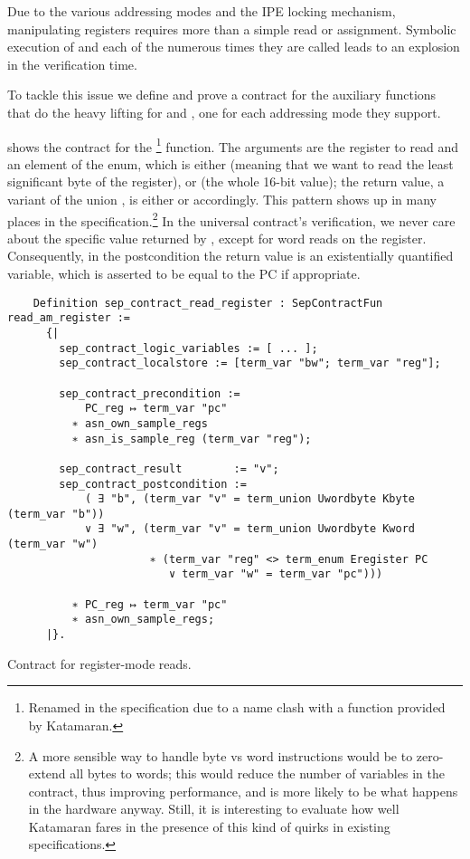 Due to the various addressing modes and the IPE locking mechanism, manipulating registers requires more than a simple read or assignment. Symbolic execution of  and  each of the numerous times they are called leads to an explosion in the verification time.

To tackle this issue we define and prove a contract for the auxiliary functions that do the heavy lifting for  and , one for each addressing mode they support.

 shows the contract for the \footnote{Renamed  in the \usail specification due to a name clash with a function provided by Katamaran.} function. The arguments are the register to read and an element of the  enum, which is either  (meaning that we want to read the least significant byte of the register), or  (the whole 16-bit value); the return value, a variant of the union , is either  or  accordingly. This pattern shows up in many places in the \msp \usail specification.\footnote{A more sensible way to handle byte vs word instructions would be to zero-extend all bytes to words; this would reduce the number of variables in the contract, thus improving performance, and is more likely to be what happens in the hardware anyway. Still, it is interesting to evaluate how well Katamaran fares in the presence of this kind of quirks in existing specifications.} In the universal contract's verification, we never care about the specific value returned by , except for word reads on the  register. Consequently, in the postcondition the return value is an existentially quantified variable, which is asserted to be equal to the PC if appropriate.

\begin{listing}
  \begin{verbatim}
    Definition sep_contract_read_register : SepContractFun read_am_register :=
      {|
        sep_contract_logic_variables := [ ... ];
        sep_contract_localstore := [term_var "bw"; term_var "reg"];

        sep_contract_precondition :=
            PC_reg ↦ term_var "pc"
          ∗ asn_own_sample_regs
          ∗ asn_is_sample_reg (term_var "reg");

        sep_contract_result        := "v";
        sep_contract_postcondition :=
            ( ∃ "b", (term_var "v" = term_union Uwordbyte Kbyte (term_var "b"))
            ∨ ∃ "w", (term_var "v" = term_union Uwordbyte Kword (term_var "w")
                      ∗ (term_var "reg" <> term_enum Eregister PC
                         ∨ term_var "w" = term_var "pc")))

          ∗ PC_reg ↦ term_var "pc"
          ∗ asn_own_sample_regs;
      |}.
  \end{verbatim}
  \caption{Contract for register-mode reads.}
  \label{lst:read_register}
\end{listing}

